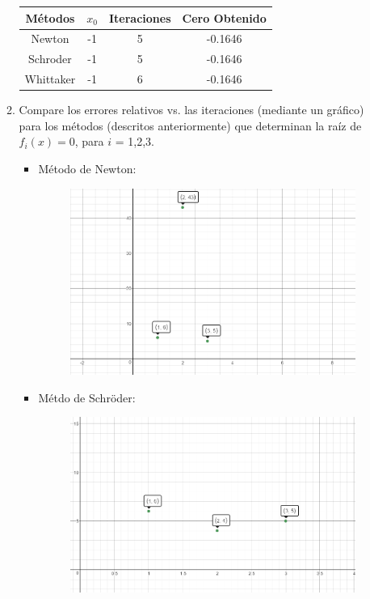 \documentclass{udpreport}
\begin{document}
\begin{enumerate}
\begin{enumerate}
		\begin{table}[H]
			\centering
			\begin{tabular}{|c|c|c|c|}
				\hline
				Métodos & $x_{0}$ & Iteraciones & Cero Obtenido \\
				\hline
				Newton & -1 & 5 & -0.1646 \\
				\hline
				Schroder & -1 & 5 & -0.1646\\
				\hline
				Whittaker & -1 & 6 & -0.1646 \\
				\hline				
			\end{tabular}
		\end{table}		
\newpage			
		\item Compare los errores relativos vs. las iteraciones (mediante un gráfico) para los métodos (descritos
			anteriormente) que determinan la raíz de $f_{i}(x)=0$, para $i$ = 1,2,3.	
			\begin{itemize}
				\item Método de Newton:
				\begin{figure}[H]
					\centering	
						\includegraphics[width=10cm]{NewtonEj6} 
				\end{figure}
								
				\item Métdo de Schröder: 
				 \begin{figure}[H]
					\centering
					\includegraphics[width=10cm]{SchroderEj6} 
				\end{figure}	
				 

\end{itemize}
\end{enumerate}
\end{enumerate}
\end{document}
